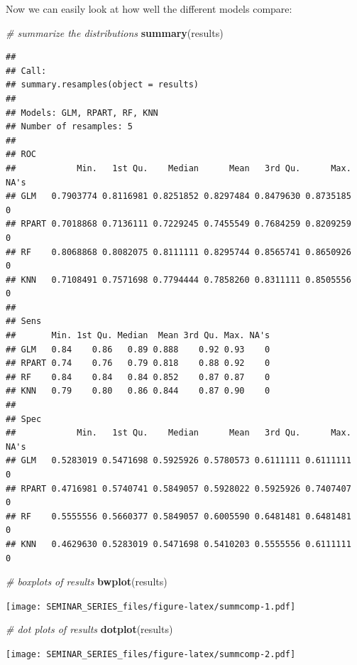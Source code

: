 \documentclass[
]{book}
\newenvironment{Shaded}{\begin{snugshade}}{\end{snugshade}}
\newcommand{\CommentTok}[1]{\textcolor[rgb]{0.56,0.35,0.01}{\textit{#1}}}
\newcommand{\KeywordTok}[1]{\textcolor[rgb]{0.13,0.29,0.53}{\textbf{#1}}}
\newcommand{\NormalTok}[1]{#1}
\begin{document}
Now we can easily look at how well the different models compare:

\begin{Shaded}
\begin{Highlighting}[]
\CommentTok{# summarize the distributions}
\KeywordTok{summary}\NormalTok{(results)}
\end{Highlighting}
\end{Shaded}

\begin{verbatim}
## 
## Call:
## summary.resamples(object = results)
## 
## Models: GLM, RPART, RF, KNN 
## Number of resamples: 5 
## 
## ROC 
##            Min.   1st Qu.    Median      Mean   3rd Qu.      Max. NA's
## GLM   0.7903774 0.8116981 0.8251852 0.8297484 0.8479630 0.8735185    0
## RPART 0.7018868 0.7136111 0.7229245 0.7455549 0.7684259 0.8209259    0
## RF    0.8068868 0.8082075 0.8111111 0.8295744 0.8565741 0.8650926    0
## KNN   0.7108491 0.7571698 0.7794444 0.7858260 0.8311111 0.8505556    0
## 
## Sens 
##       Min. 1st Qu. Median  Mean 3rd Qu. Max. NA's
## GLM   0.84    0.86   0.89 0.888    0.92 0.93    0
## RPART 0.74    0.76   0.79 0.818    0.88 0.92    0
## RF    0.84    0.84   0.84 0.852    0.87 0.87    0
## KNN   0.79    0.80   0.86 0.844    0.87 0.90    0
## 
## Spec 
##            Min.   1st Qu.    Median      Mean   3rd Qu.      Max. NA's
## GLM   0.5283019 0.5471698 0.5925926 0.5780573 0.6111111 0.6111111    0
## RPART 0.4716981 0.5740741 0.5849057 0.5928022 0.5925926 0.7407407    0
## RF    0.5555556 0.5660377 0.5849057 0.6005590 0.6481481 0.6481481    0
## KNN   0.4629630 0.5283019 0.5471698 0.5410203 0.5555556 0.6111111    0
\end{verbatim}

\begin{Shaded}
\begin{Highlighting}[]
\CommentTok{# boxplots of results}
\KeywordTok{bwplot}\NormalTok{(results)}
\end{Highlighting}
\end{Shaded}

\texttt{[image: SEMINAR\_SERIES\_files/figure-latex/summcomp-1.pdf]}

\begin{Shaded}
\begin{Highlighting}[]
\CommentTok{# dot plots of results}
\KeywordTok{dotplot}\NormalTok{(results)}
\end{Highlighting}
\end{Shaded}

\texttt{[image: SEMINAR\_SERIES\_files/figure-latex/summcomp-2.pdf]}
\end{document}
